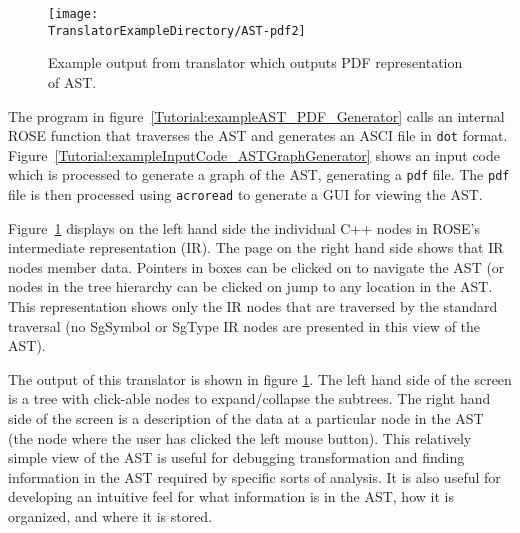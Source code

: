 \begin{figure}
\texttt{[image: \\TranslatorExampleDirectory/AST-pdf2]}
\caption{Example output from translator which outputs PDF representation of AST.}
\label{tutorial:exampleOutputCodePDF}
\end{figure}

The program in figure~\ref{Tutorial:exampleAST_PDF_Generator} calls 
an internal ROSE function that traverses the AST and generates 
an ASCI file in {\tt dot} format.
Figure~\ref{Tutorial:exampleInputCode_ASTGraphGenerator} shows an input
code which is processed to generate a graph of the AST, generating a 
{\tt pdf} file.   The {\tt pdf} file is then processed
using {\tt acroread} to generate a GUI for viewing the AST.

   Figure~\ref{tutorial:exampleOutputCodePDF} displays on the left hand side the individual
C++ nodes in ROSE's intermediate representation (IR).  The page on the right hand side
shows that IR nodes member data. Pointers in boxes can be clicked on to navigate the AST
(or nodes in the tree hierarchy can be clicked on jump to any location in the AST.
This representation shows only the IR nodes that are traversed by the standard traversal
(no SgSymbol or SgType IR nodes are presented in this view of the AST).

The output of this translator is shown in figure \ref{tutorial:exampleOutputCodePDF}.  The left hand side
of the screen is a tree with click-able nodes to expand/collapse the subtrees.
The right hand side of the screen is a description of the data at a particular 
node in the AST (the node where the user has clicked the left mouse button).
This relatively simple view of the AST is useful for debugging transformation and finding
information in the AST required by specific sorts of analysis.  It is also useful
for developing an intuitive feel for what information is in the AST, how it is organized, 
and where it is stored.

